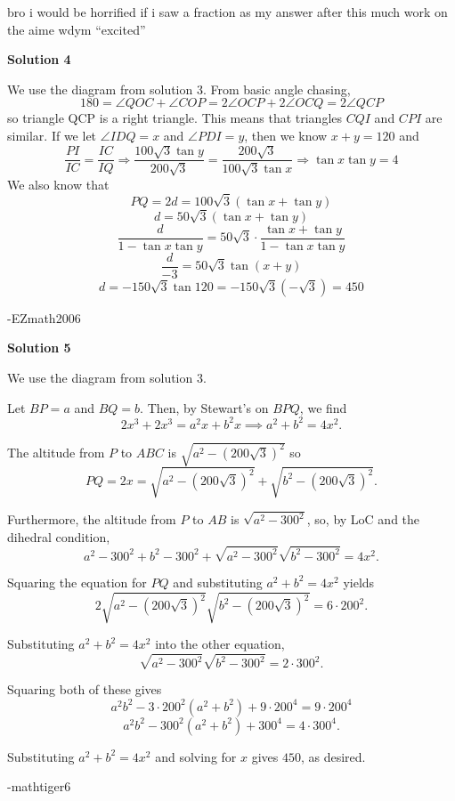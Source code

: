 \begin{enumerate}
 bro i would be horrified if i saw a fraction as my answer after this much work on the aime wdym “excited”

 



\textbf{Solution 4}

We use the diagram from solution 3. From basic angle chasing,
 \[180=\angle{QOC}+\angle{CO}P=2\angle{OCP}+2\angle{OCQ}=2\angle{QCP}\]so triangle QCP is a right triangle. This means that triangles $CQI$ and $CPI$ are similar. If we let $\angle{IDQ}=x$ and $\angle{PDI}=y$, then we know $x+y=120$ and 
 \[\frac{PI}{IC}=\frac{IC}{IQ}\Rightarrow\frac{100\sqrt{3}\tan{y}}{200\sqrt{3}}=\frac{200\sqrt{3}}{100\sqrt{3}\tan{x}}\Rightarrow\tan{x}\tan{y}=4\] We also know that 
 \[PQ=2d=100\sqrt{3}(\tan{x}+\tan{y})\] 
 \[d=50\sqrt{3}(\tan{x}+\tan{y})\] 
 \[\frac{d}{1-\tan{x}\tan{y}}=50\sqrt{3}\cdot\frac{\tan{x}+\tan{y}}{1-\tan{x}\tan{y}}\] 
 \[\frac{d}{-3}=50\sqrt{3}\tan{(x+y)}\] 
 \[d=-150\sqrt{3}\tan{120}=-150\sqrt{3}(-\sqrt{3})=\boxed{450}\]

 -EZmath2006

 



\textbf{Solution 5}

We use the diagram from solution 3.

 Let $BP = a$ and $BQ = b$. Then, by Stewart's on $BPQ$, we find
 \[2x^3 + 2x^3 = a^2x + b^2x \implies a^2 + b^2 = 4x^2.\]

 The altitude from $P$ to $ABC$ is $\sqrt{a^2 - (200\sqrt{3})^2}$ so
 \[PQ = 2x = \sqrt{a^2 - (200\sqrt{3})^2} + \sqrt{b^2 - (200\sqrt{3})^2}.\]

 Furthermore, the altitude from $P$ to $AB$ is $\sqrt{a^2 - 300^2}$, so, by LoC and the dihedral condition,
 \[a^2 - 300^2 + b^2 - 300^2 + \sqrt{a^2 - 300^2}\sqrt{b^2-300^2} = 4x^2.\]

 Squaring the equation for $PQ$ and substituting $a^2 + b^2  = 4x^2$ yields
 \[2\sqrt{a^2 - (200\sqrt{3})^2}\sqrt{b^2 - (200\sqrt{3})^2} = 6\cdot 200^2.\]

 Substituting $a^2 + b^2 = 4x^2$ into the other equation,
 \[\sqrt{a^2 - 300^2}\sqrt{b^2-300^2} = 2\cdot 300^2.\]

 Squaring both of these gives
 \[a^2b^2-3\cdot 200^2(a^2 + b^2) + 9\cdot 200^4 = 9\cdot 200^4\]
 \[a^2b^2 - 300^2(a^2+b^2) + 300^4 = 4\cdot 300^4.\]

 Substituting $a^2 + b^2 = 4x^2$ and solving for $x$ gives $\boxed{450}$, as desired.

 -mathtiger6


\end{enumerate}
